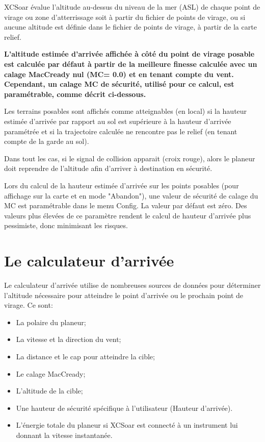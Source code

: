 XCSoar évalue l'altitude au-dessus du niveau de la mer (ASL) de chaque point de virage ou zone d'atterrissage soit à partir du fichier de points de virage, ou si aucune altitude est définie dans le fichier de points de virage, à partir de la carte relief.

\textbf{L'altitude estimée d'arrivée affichée à côté du point de virage posable est calculée par défaut à partir de la meilleure finesse calculée avec un calage MacCready nul (MC= 0.0) et en tenant compte du vent. Cependant, un calage MC de sécurité, utilisé pour ce calcul,  est paramétrable, comme décrit ci-dessous.}

Les terrains posables sont affichés comme atteignables (en local) si la hauteur estimée d'arrivée par rapport au sol  est supérieure à la hauteur d'arrivée paramétrée et si la trajectoire calculée ne rencontre pas le relief (en tenant compte de la garde au sol).

Dans tout les cas, si le signal de collision apparait (croix rouge), alors le planeur doit reprendre de l'altitude afin d'arriver à destination en sécurité.

Lors du calcul de la hauteur estimée d'arrivée sur les points posables (pour affichage sur la carte et en mode "Abandon"), une valeur de sécurité de calage du MC  est paramétrable dans le menu Config. La valeur par défaut est zéro. Des valeurs plus élevées de ce paramètre rendent le calcul de hauteur d'arrivée plus pessimiste, donc minimisant les risques.

\section{Le calculateur d'arrivée}

Le calculateur d'arrivée utilise de nombreuses sources de données pour déterminer l'altitude nécessaire pour atteindre le point d'arrivée ou le prochain point de virage. Ce sont:

\begin{itemize}
\item La polaire du planeur;
\item La vitesse et la direction du vent;
\item La distance et le cap pour atteindre la cible;
\item Le calage MacCready;
\item L'altitude de la cible;
\item Une hauteur de sécurité spécifique à l'utilisateur (Hauteur d'arrivée).
\item L'énergie totale du planeur si XCSoar est connecté à un instrument lui donnant la vitesse instantanée.
\end{itemize}

